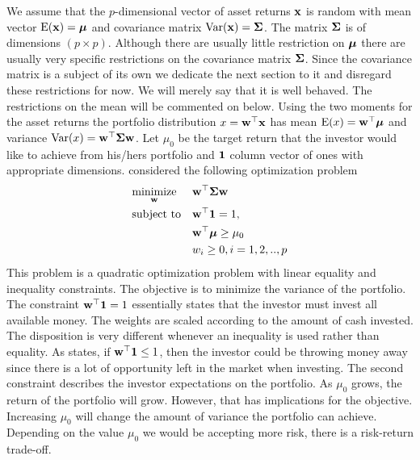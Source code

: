 \documentclass[oneside]{book}\usepackage{knitr}
\begin{document}
We assume that the $p$-dimensional vector of asset returns $\mathbf{x}$ is random with mean vector $\operatorname{E}(\mathbf{x})=\mbox{\boldmath$\mu$}$ and covariance matrix $\operatorname{Var}(\mathbf{x})=\mathbf{\Sigma}$. 
The matrix $\mathbf{\Sigma}$ is of dimensions $(p \times p)$. 
Although there are usually little restriction on $\mbox{\boldmath$\mu$}$ there are usually very specific restrictions on the covariance matrix $\mathbf{\Sigma}$. 
Since the covariance matrix is a subject of its own we dedicate the next section to it and disregard these restrictions for now.
We will merely say that it is well behaved. 
The restrictions on the mean will be commented on below. 
Using the two moments for the asset returns the portfolio distribution $x = \mathbf{w}^\top \mathbf{x}$ has mean $\operatorname{E}(x)=\mathbf{w}^\top \mbox{\boldmath$\mu$}$ and variance $\operatorname{Var}(x)=\mathbf{w}^\top \mathbf{\Sigma} \mathbf{w}$. 
Let $\mu_0$ be the target return that the investor would like to achieve from his/hers portfolio and $\mathbf{1}$ column vector of ones with appropriate dimensions. 
\textcite{markowitz1959portfolio} considered the following optimization problem
\begin{equation}\label{eqn:markowitz_optim}
\begin{aligned}
& \underset{\mathbf{w}}{\text{minimize}} 
& & \mathbf{w}^\top \mathbf{\Sigma} \mathbf{w} \\
& \text{subject to}
& & \mathbf{w}^\top \mathbf{1} = 1, \\
& && \mathbf{w}^\top \mbox{\boldmath$\mu$} \geq \mu_0 \\
&&& w_i \geq 0, i=1,2,..,p
\end{aligned}
\end{equation}
This problem is a quadratic optimization problem with linear equality and inequality constraints. 
The objective is to minimize the variance of the portfolio. 
The constraint $\mathbf{w}^\top \mathbf{1} = 1$ essentially states that the investor must invest all available money. 
The weights are scaled according to the amount of cash invested.
The disposition is very different whenever an inequality is used rather than equality. 
As \textcite{hult2012risk} states, if $\mathbf{w}^\top \mathbf{1} \leq 1$, then the investor could be throwing money away since there is a lot of opportunity left in the market when investing.
The second constraint describes the investor expectations on the portfolio. 
As $\mu_0$ grows, the return of the portfolio will grow. 
However, that has implications for the objective. 
Increasing $\mu_0$ will change the amount of variance the portfolio can achieve. 
Depending on the value $\mu_0$ we would be accepting more risk, there is a risk-return trade-off. 
\end{document}

